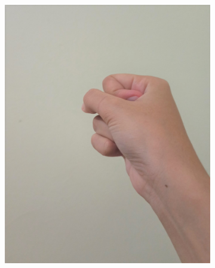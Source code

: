 \documentclass[conference]{IEEEtran}
\begin{document}
\begin{figure} [h]
\begin{center}
\begin{subfigure}[t]{0.11\textwidth}
			\includegraphics[width=\textwidth]{img/pola1b.jpg}
			\caption{\label{fig:gs1b}}
		\end{subfigure}
		\hspace{0.1em}
		\begin{subfigure}[t]{0.11\textwidth}

\end{subfigure}
\end{center}
\end{figure}
\end{document}
